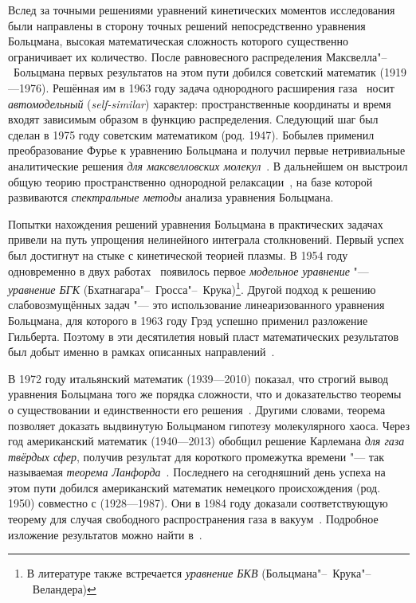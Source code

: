 \documentclass[a4paper, 12pt, oneside]{article} %
\begin{document}
Вслед за точными решениями уравнений кинетических моментов исследования
были направлены в сторону точных решений непосредственно уравнения
Больцмана, высокая математическая сложность которого существенно
ограничивает их количество. После равновесного распределения
Максвелла"--~Больцмана первых результатов на этом пути добился советский
математик  (1919---1976). Решённая им в
1963 году задача однородного расширения
газа~\cite{nikolskii1963selfsimilar} носит \emph{автомодельный}
(\emph{self-similar}) характер: пространственные координаты и время
входят зависимым образом в функцию распределения. Следующий шаг был
сделан в 1975 году советским математиком  (род. 1947).
Бобылев применил преобразование Фурье к уравнению Больцмана и получил
первые нетривиальные аналитические решения \emph{для максвелловских
молекул}~\cite{bobylev1975solution}. В дальнейшем он выстроил общую
теорию пространственно однородной релаксации~\cite{bobylev1984exact}, на
базе которой развиваются \emph{спектральные методы} анализа уравнения
Больцмана.

Попытки нахождения решений уравнения Больцмана в практических задачах
привели на путь упрощения нелинейного интеграла столкновений. Первый
успех был достигнут на стыке с кинетической теорией плазмы. В 1954 году
одновременно в двух работах~\cite{bhatnagar1954model,
welander1954temperature} появилось первое \emph{модельное уравнение}
"--- \emph{уравнение БГК} (Бхатнагара"--~Гросса"--~Крука)\footnote{В
литературе также встречается \emph{уравнение БКВ}
(Больцмана"--~Крука"--~Веландера)}. Другой подход к решению
слабовозмущённых задач "--- это использование линеаризованного уравнения
Больцмана, для которого в 1963 году Грэд успешно применил разложение
Гильберта. Поэтому в эти десятилетия новый пласт математических
результатов был добыт именно в рамках описанных
направлений~\cite{cercignani1973mathematical}.

В 1972 году итальянский математик 
(1939---2010) показал, что строгий вывод уравнения Больцмана того же
порядка сложности, что и доказательство теоремы о существовании и
единственности его решения~\cite{cercignani1972boltzmann}. Другими
словами, теорема позволяет доказать выдвинутую Больцманом гипотезу
молекулярного хаоса. Через год американский математик  (1940---2013) обобщил решение Карлемана \emph{для газа твёрдых
сфер}, получив результат для короткого промежутка времени "--- так
называемая \emph{теорема Ланфорда}~\cite{lanford1975time}. Последнего на
сегодняшний день успеха на этом пути добился американский математик
немецкого происхождения  (род. 1950) совместно с
 (1928---1987). Они в 1984 году доказали
соответствующую теорему для случая свободного распространения газа в
вакуум~\cite{illner1984boltzmann}. Подробное изложение результатов можно
найти в~\cite{cercignani1994mathematical}.
\end{document}

